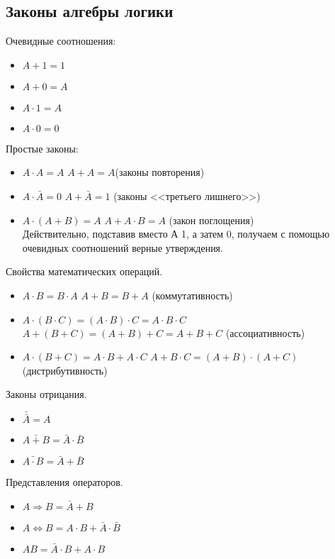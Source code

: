 \documentclass[a4paper, fleqn]{article}
\begin{document}
\subsection*{Законы алгебры логики}
	Очевидные соотношения:
	\begin{itemize}
		\item $A+1 = 1$
		\item $A+0=A$
		\item $A\cdot1=A$
		\item $A\cdot0=0$
	\end{itemize}
	Простые законы:
	\begin{itemize}
		\item $A\cdot A = A$ \qquad $ A + A = A$(законы повторения)
		\item $A\cdot\bar{A}=0$ \qquad $A + \bar{A} = 1$ (законы <<третьего лишнего>>)
		\item $A\cdot(A+B)=A$ $A+A\cdot B=A$ (закон поглощения)\\
		Действительно, подставив вместо А 1, а затем 0, получаем с помощью очевидных соотношений верные утверждения.
	\end{itemize}
	
	Свойства математических операций.
	\begin{itemize}
		\item $A\cdot B=B\cdot A$ \qquad $A+B=B+A$ (коммутативность)
		\item $A\cdot(B\cdot C)= (A\cdot B)\cdot C = A\cdot B\cdot C$ \qquad $A+(B+C)=(A+B)+C=A+B+C$ (ассоциативность)
		\item $A\cdot(B+C)=A\cdot B+A\cdot C$ \qquad $A+B\cdot C = (A+B)\cdot(A+C)$  (дистрибутивность)
	\end{itemize}
	
	Законы отрицания.
	\begin{itemize}
		\item $\bar{\bar{A}}=A$
		\item $\bar{A+B}=\bar{A}\cdot\bar{B}$
		\item $\bar{A\cdot B}=\bar{A}+\bar{B}$
	\end{itemize}
	
	Представления операторов.
	\begin{itemize}
		\item $A \Rightarrow B = \bar{A} + B$
		\item $A \Leftrightarrow B = A\cdot B + \bar{A}\cdot \bar{B}$
		\item $A B = \bar{A}\cdot B + A\cdot B$
	\end{itemize}
	
\end{document}
